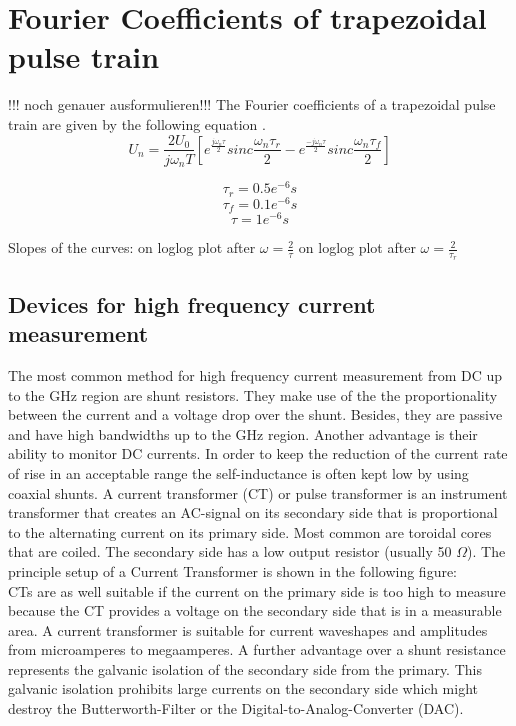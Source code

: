 \section{Fourier Coefficients of trapezoidal pulse  train }
!!! noch genauer ausformulieren!!!
The Fourier coefficients of a trapezoidal pulse train are given by the following equation \cite{}. 
\begin{equation}
 U_n = \frac{2 U_0}{j \omega_n T} [e^{\frac{j \omega_n \tau}{2}} sinc{\frac { \omega_n \tau_r }{2}} -e^{\frac{-j \omega_n \tau}{2}} sinc{\frac{ \omega_n \tau_f}{2}}]
\end{equation}

 
\begin{equation}
 \tau_r = 0.5e^{-6 } s
  \end{equation}
  \begin{equation}
 \tau_f = 0.1e^{-6} s
  \end{equation}
 \begin{equation}
\tau= 1e^{-6} s
 \end{equation}
 
Slopes of the curves:  on loglog plot after $\omega = \frac{2}{\tau}$  on loglog plot after $\omega = \frac{2}{\tau_r}$



	
\subsection{Devices for high frequency current measurement}
The most common method for high frequency current measurement from DC up to the GHz region are shunt resistors. They make use of the the proportionality between the current and a voltage drop over the shunt. Besides, they are passive and have high bandwidths up to the GHz region. Another advantage is their ability to monitor DC currents. In order to keep the reduction of the current rate of rise in an acceptable range the self-inductance is often kept low by using coaxial shunts. \cite{highdynamiccurrent}
A current transformer (CT) or pulse transformer is an instrument transformer that creates an AC-signal on its secondary side that is proportional to the alternating current on its primary side. Most common are toroidal cores that are coiled. The secondary side has a low output resistor (usually 50 $\Omega$).
The principle setup of a Current Transformer is shown in the following figure: 
\\CTs are as well suitable if the current on the primary side is too high to measure because the CT provides a voltage on the secondary side that is in a measurable area. A current transformer is suitable for current waveshapes and amplitudes from microamperes to megaamperes. A further advantage over a shunt resistance represents the galvanic isolation of the secondary side from the primary. This galvanic isolation prohibits large currents on the secondary side which might destroy the Butterworth-Filter or the Digital-to-Analog-Converter (DAC). 

